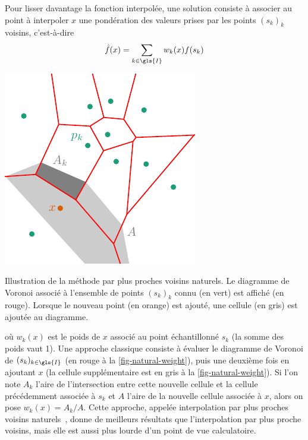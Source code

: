 Pour lisser davantage la fonction interpolée, une solution consiste à associer au point à interpoler $x$ une pondération des valeurs prises par les points $(s_k)_k$ voisins, c'est-à-dire
\begin{equation}\label{eq-weighted-interp}
    \hat{f}(x) = \sum_{k\in\gls{I}} w_k(x) f(s_k)
\end{equation}%
\begin{marginfigure}%
    \centering
    \includegraphics[]{img/chapitre2/figure3/Voronoi_Natural.pdf}
    \caption{Illustration de la méthode par plus proches voisins naturels. Le diagramme de Voronoi associé à l'ensemble de points $(s_k)_k$ connu (en vert) est affiché (en rouge). Lorsque le nouveau point (en orange) est ajouté, une cellule (en gris) est ajoutée au diagramme.}
    \label{fig-natural-weight}
\end{marginfigure}%
\noindent où $w_k(x)$ est le poids de $x$ associé au point échantillonné $s_k$ (la somme des poids vaut 1). Une approche classique consiste à évaluer le diagramme de Voronoi de $(s_k)_{k\in\gls{I}}$ (en rouge à la \cref{fig-natural-weight}), puis une deuxième fois en ajoutant $x$ (la cellule supplémentaire est en gris à la \cref{fig-natural-weight}). Si l'on note $A_k$ l'aire de l'intersection entre cette nouvelle cellule et la cellule précédemment associée à $s_k$ et $A$ l'aire de la nouvelle cellule associée à $x$, alors on pose $w_k(x)=A_k/A$. Cette approche, appelée interpolation par plus proches voisins naturels~\cite{sibson1981interpreting,cazals2006delaunay}, donne de meilleurs résultats que l'interpolation par plus proche voisins, mais elle est aussi plus lourde d'un point de vue calculatoire.


